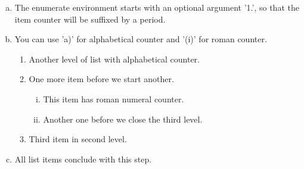 \documentclass{article}
\begin{document}
\begin{enumerate}[a)]
	\item The enumerate environment starts with an optional
	argument '1.', so that the item counter will be suffixed
	by a period.

	\item You can use 'a)' for alphabetical counter and '(i)'
	for roman counter.

	\begin{enumerate}[1)]
		\item Another level of list with alphabetical counter.

		\item One more item before we start another.

		\begin{enumerate}[(i)]
			\item This item has roman numeral counter.

			\item Another one before we close the third level.
		\end{enumerate}

		\item Third item in second level.
	\end{enumerate}

	\item All list items conclude with this step.
\end{enumerate}
\end{document}
